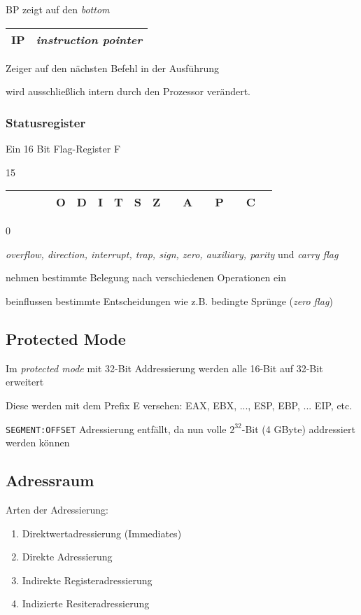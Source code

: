 BP zeigt auf den \emph{bottom}

\begin{tabular}{|c|l|}
\hline IP & \emph{instruction pointer} \\
\hline
\end{tabular}

Zeiger auf den nächsten Befehl in der Ausführung

wird ausschließlich intern durch den Prozessor verändert.

\subsubsection{Statusregister}

Ein 16 Bit Flag-Register F

{\small 15}
\begin{tabular}{|c|c|c|c|c|c|c|c|c|c|c|c|c|c|c|c|c|}
\hline & & & & O & D & I & T & S & Z & & A & & P & & C \\
\hline
\end{tabular}
{\small 0}

\emph{overflow, direction, interrupt, trap, sign, zero, auxiliary, parity}
und \emph{carry flag} 

nehmen bestimmte Belegung nach verschiedenen Operationen ein

beinflussen bestimmte Entscheidungen wie z.B. bedingte Sprünge (\emph{zero flag})



\subsection{Protected Mode}
Im \emph{protected mode} mit 32-Bit Addressierung werden alle 16-Bit auf 32-Bit erweitert

Diese werden mit dem Prefix E versehen: EAX, EBX, ..., ESP, EBP, ... EIP, etc.

\texttt{SEGMENT:OFFSET} Adressierung entfällt, da nun volle $2^{32}$-Bit (4 GByte) addressiert
werden können



\subsection{Adressraum}

Arten der Adressierung:

\begin{enumerate}
\item Direktwertadressierung (Immediates)
\item Direkte Adressierung
\item Indirekte Registeradressierung
\item Indizierte Resiteradressierung
\end{enumerate}


